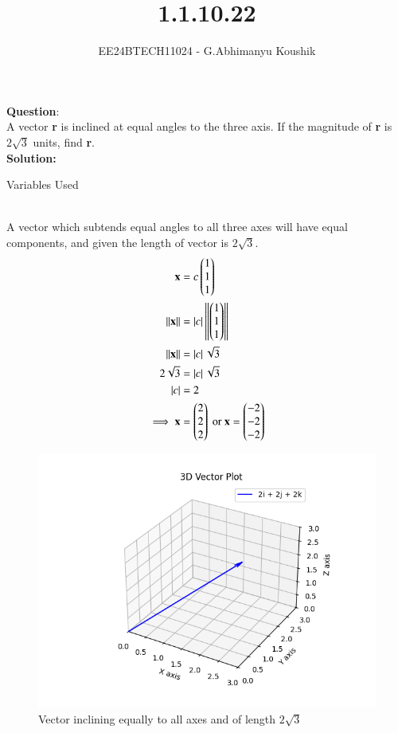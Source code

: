 \documentclass[journal]{IEEEtran}
\begin{document}

\vspace{3cm}

\title{1.1.10.22}
\author{EE24BTECH11024 - G.Abhimanyu Koushik}
{\let\newpage\relax\maketitle}

\renewcommand{\thefigure}{\theenumi}
\renewcommand{\thetable}{\theenumi}
\setlength{\intextsep}{10pt} %


\renewcommand{\thetable}{\theenumi}


\textbf{Question}:\\
A vector \textbf{r} is inclined at equal angles to the three axis. If the magnitude of \textbf{r} is $2\sqrt{3}$ units, find \textbf{r}.
\\
\textbf{Solution: }
\begin{table}[h!]    
  \centering
  
  \caption{Variables Used}
  \label{tab10.5.3.9.1}
\end{table}\\
A vector which subtends equal angles to all three axes will have equal components, and given the length of vector is $2\sqrt{3}$.
\begin{align}
	\mathbf{x} &= c\begin{pmatrix}1\\1\\1\end{pmatrix}\\
	\left\lVert\mathbf{x}\right\rVert &= \left\vert c\right\vert\left\lVert\begin{pmatrix}1\\1\\1\end{pmatrix}\right\rVert\\
	\left\lVert\mathbf{x}\right\rVert &= \left\vert c\right\vert\sqrt{3}\\
	2\sqrt{3} &= \left\vert c\right\vert\sqrt{3}\\
	\left\vert c\right\vert &= 2\\
\implies \mathbf{x}&=\begin{pmatrix}2\\2\\2\end{pmatrix} \text{ or } \mathbf{x}=\begin{pmatrix}-2\\-2\\-2\end{pmatrix}
\end{align}
\begin{figure}[h!]
   \centering
   \includegraphics[width=0.7\linewidth]{figs/fig.png}
   \caption{Vector inclining equally to all axes and of length $2\sqrt{3}$}
   \label{stemplot}
\end{figure}
\end{document}
